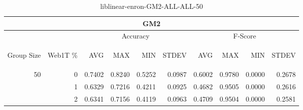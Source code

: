 \begin{center}
\begin{table}[htbp] 
 \begin{center}
\begin{tabular}{ | r | r | r | r | r | r | r | r | r | r |}
\hline
\multicolumn{10}{|c|}{GM2}\\
\hline
 & & \multicolumn{4}{|c|}{Accuracy} & \multicolumn{4}{|c|}{F-Score}\\ \cline{3-10}
\begin{sideways}Group Size\end{sideways} & \begin{sideways}Web1T \%\end{sideways} & \begin{sideways}AVG\end{sideways} & \begin{sideways}MAX\end{sideways} & \begin{sideways}MIN\end{sideways} & \begin{sideways}STDEV\end{sideways} & \begin{sideways}AVG\end{sideways} & \begin{sideways}MAX\end{sideways} & \begin{sideways}MIN\end{sideways} & \begin{sideways}STDEV\end{sideways}\\
\hline
\multirow{2}{*}{50}
 & 0 & 0.7402 & 0.8240 & 0.5252 & 0.0987 & 0.6002 & 0.9780 & 0.0000 & 0.2678\\ \cline{2-10}
 & 1 & 0.6329 & 0.7216 & 0.4211 & 0.0925 & 0.4682 & 0.9505 & 0.0000 & 0.2616\\ \cline{2-10}
 & 2 & 0.6341 & 0.7156 & 0.4119 & 0.0963 & 0.4709 & 0.9504 & 0.0000 & 0.2581\\ \cline{2-10}
\hline
\end{tabular}
\caption{liblinear-enron-GM2-ALL-ALL-50}
\label{table:liblinear-enron-GM2-ALL-ALL-50}
\end{center}
 \end{table}
\end{center}

